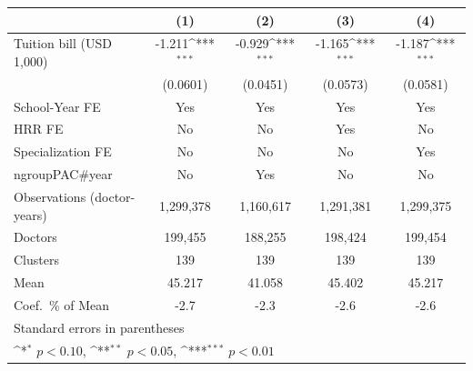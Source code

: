 {
\def\sym#1{\ifmmode^{#1}\else\(^{#1}\)\fi}
\begin{tabular}{l*{4}{c}}
\hline\hline
                    &\multicolumn{1}{c}{(1)}         &\multicolumn{1}{c}{(2)}         &\multicolumn{1}{c}{(3)}         &\multicolumn{1}{c}{(4)}         \\
\hline
Tuition bill (USD 1,000)&      -1.211\sym{***}&      -0.929\sym{***}&      -1.165\sym{***}&      -1.187\sym{***}\\
                    &    (0.0601)         &    (0.0451)         &    (0.0573)         &    (0.0581)         \\
[1em]
School-Year FE      &         Yes         &         Yes         &         Yes         &         Yes         \\
[1em]
HRR FE              &          No         &          No         &         Yes         &          No         \\
[1em]
Specialization FE   &          No         &          No         &          No         &         Yes         \\
[1em]
ngroupPAC#year      &          No         &         Yes         &          No         &          No         \\
\hline
Observations (doctor-years)&   1,299,378         &   1,160,617         &   1,291,381         &   1,299,375         \\
Doctors             &     199,455         &     188,255         &     198,424         &     199,454         \\
Clusters            &         139         &         139         &         139         &         139         \\
Mean                &      45.217         &      41.058         &      45.402         &      45.217         \\
Coef.\ \% of Mean   &        -2.7         &        -2.3         &        -2.6         &        -2.6         \\
\hline\hline
\multicolumn{5}{l}{\footnotesize Standard errors in parentheses}\\
\multicolumn{5}{l}{\footnotesize \sym{*} \(p<0.10\), \sym{**} \(p<0.05\), \sym{***} \(p<0.01\)}\\
\end{tabular}
}
